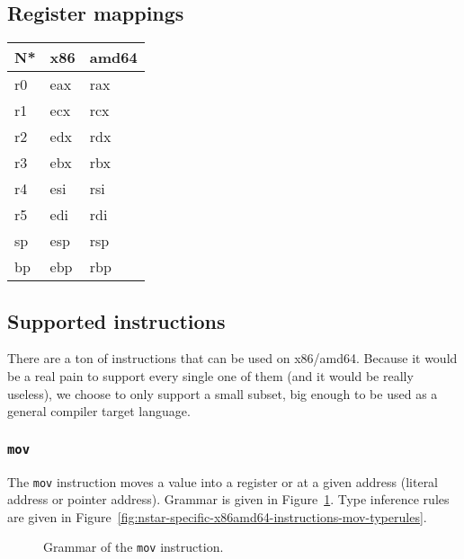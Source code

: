 \subsection{Register mappings}\label{subsec:nstar-specific-x86amd64-registers}

\begin{tabularx}{\textwidth}{Y Y Y}
  \toprule
  N* & x86 & amd64 \\
  \midrule
  r0 & eax & rax \\
  r1 & ecx & rcx \\
  r2 & edx & rdx \\
  r3 & ebx & rbx \\
  r4 & esi & rsi \\
  r5 & edi & rdi \\
  \cmidrule(lr){1-3}
  sp & esp & rsp \\
  bp & ebp & rbp \\
  \bottomrule
\end{tabularx}

\subsection{Supported instructions}\label{subsec:nstar-specific-x86amd64-instructions}

There are a ton of instructions that can be used on x86/amd64.
Because it would be a real pain to support every single one of them (and it would be really useless), we choose to only support a small subset, big enough to be used as a general compiler target language.

\subsubsection{\texttt{mov}}\label{subsubsec:nstar-specific-x86amd64-instructions-mov}

The \texttt{mov} instruction moves a value into a register or at a given address (literal address or pointer address).
Grammar is given in Figure~\ref{fig:nstar-specific-x86amd64-instructions-mov-grammar}.
Type inference rules are given in Figure~\ref{fig:nstar-specific-x86amd64-instructions-mov-typerules}.

\begin{figure}[H]
  \centering
  \caption{Grammar of the \texttt{mov} instruction.}
  \label{fig:nstar-specific-x86amd64-instructions-mov-grammar}
\end{figure}

